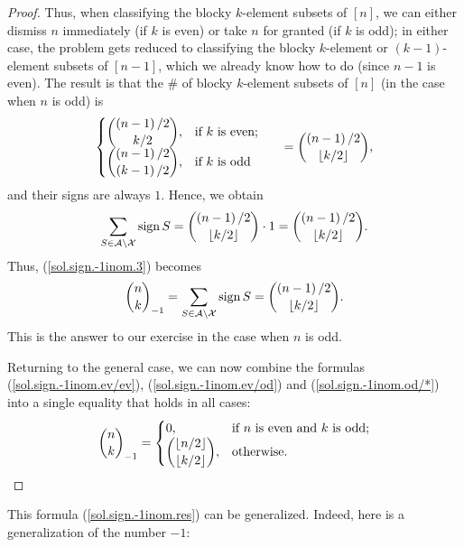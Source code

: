 \begin{proof}
Thus, when classifying the blocky $k$-element subsets of $\left[  n\right]  $,
we can either dismiss $n$ immediately (if $k$ is even) or take $n$ for granted
(if $k$ is odd); in either case, the problem gets reduced to classifying the
blocky $k$-element or $\left(  k-1\right)  $-element subsets of $\left[
n-1\right]  $, which we already know how to do (since $n-1$ is even). The
result is that the \# of blocky $k$-element subsets of $\left[  n\right]  $
(in the case when $n$ is odd) is%
\[%
\begin{cases}
\dbinom{\left(  n-1\right)  /2}{k/2}, & \text{if }k\text{ is even;}\\
\dbinom{\left(  n-1\right)  /2}{\left(  k-1\right)  /2}, & \text{if }k\text{
is odd}%
\end{cases}
\ \ \ \ \ =\dbinom{\left(  n-1\right)  /2}{\left\lfloor k/2\right\rfloor },
\]
and their signs are always $1$. Hence, we obtain%
\[
\sum_{S\in\mathcal{A}\setminus\mathcal{X}}\operatorname*{sign}S=\dbinom
{\left(  n-1\right)  /2}{\left\lfloor k/2\right\rfloor }\cdot1=\dbinom{\left(
n-1\right)  /2}{\left\lfloor k/2\right\rfloor }.
\]
Thus, (\ref{sol.sign.-1inom.3}) becomes%
\begin{equation}
\dbinom{n}{k}_{-1}=\sum_{S\in\mathcal{A}\setminus\mathcal{X}}%
\operatorname*{sign}S=\dbinom{\left(  n-1\right)  /2}{\left\lfloor
k/2\right\rfloor }. \label{sol.sign.-1inom.od/*}%
\end{equation}
This is the answer to our exercise in the case when $n$ is odd.

Returning to the general case, we can now combine the formulas
(\ref{sol.sign.-1inom.ev/ev}), (\ref{sol.sign.-1inom.ev/od}) and
(\ref{sol.sign.-1inom.od/*}) into a single equality that holds in all cases:%
\begin{equation}
\dbinom{n}{k}_{-1}=%
\begin{cases}
0, & \text{if }n\text{ is even and }k\text{ is odd;}\\
\dbinom{\left\lfloor n/2\right\rfloor }{\left\lfloor k/2\right\rfloor }, &
\text{otherwise.}%
\end{cases}
\label{sol.sign.-1inom.res}%
\end{equation}

\end{proof}

This formula (\ref{sol.sign.-1inom.res}) can be generalized. Indeed, here is a
generalization of the number $-1$:

